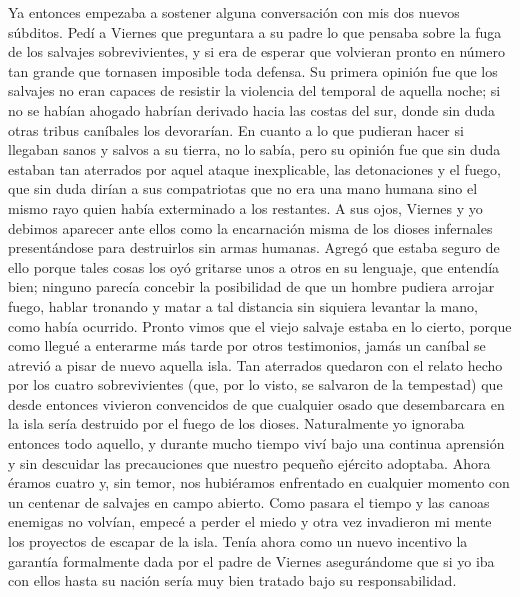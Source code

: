\documentclass{novela}
\begin{document}
    Ya entonces empezaba a sostener alguna conversación con mis dos nuevos súbditos. Pedí a Viernes que preguntara a su padre lo que pensaba sobre la fuga de los salvajes sobrevivientes, y si era de esperar que volvieran pronto en número tan grande que tornasen imposible toda defensa. Su primera opinión fue que los salvajes no eran capaces de resistir la violencia del temporal de aquella noche; si no se habían ahogado habrían derivado hacia las costas del sur, donde sin duda otras tribus caníbales los devorarían. En cuanto a lo que pudieran hacer si llegaban sanos y salvos a su tierra, no lo sabía, pero su opinión fue que sin duda estaban tan aterrados por aquel ataque inexplicable, las detonaciones y el fuego, que sin duda dirían a sus compatriotas que no era una mano humana sino el mismo rayo quien había exterminado a los restantes. A sus ojos, Viernes y yo debimos aparecer ante ellos como la encarnación misma de los dioses infernales presentándose para destruirlos sin armas humanas. Agregó que estaba seguro de ello porque tales cosas los oyó gritarse unos a otros en su lenguaje, que entendía bien; ninguno parecía concebir la posibilidad de que un hombre pudiera arrojar fuego, hablar tronando y matar a tal distancia sin siquiera levantar la mano, como había ocurrido. Pronto vimos que el viejo salvaje estaba en lo cierto, porque como llegué a enterarme más tarde por otros testimonios, jamás un caníbal se atrevió a pisar de nuevo aquella isla. Tan aterrados quedaron con el relato hecho por los cuatro sobrevivientes (que, por lo visto, se salvaron de la tempestad) que desde entonces vivieron convencidos de que cualquier osado que desembarcara en la isla sería destruido por el fuego de los dioses.
    Naturalmente yo ignoraba entonces todo aquello, y durante mucho tiempo viví bajo una continua aprensión y sin descuidar las precauciones que nuestro pequeño ejército adoptaba. Ahora éramos cuatro y, sin temor, nos hubiéramos enfrentado en cualquier momento con un centenar de salvajes en campo abierto.
    Como pasara el tiempo y las canoas enemigas no volvían, empecé a perder el miedo y otra vez invadieron mi mente los proyectos de escapar de la isla. Tenía ahora como un nuevo incentivo la garantía formalmente dada por el padre de Viernes asegurándome que si yo iba con ellos hasta su nación sería muy bien tratado bajo su responsabilidad.
\end{document}
